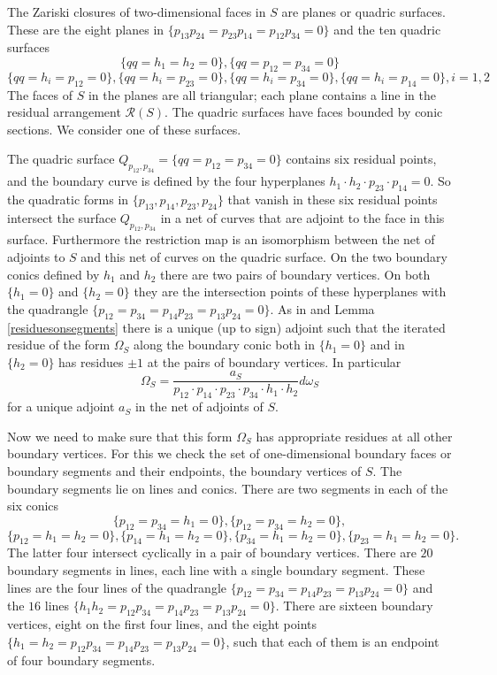 \documentclass[12pt]{extarticle}
\theoremstyle{definition}
\newenvironment{example}
{\pushQED{\qed}\renewcommand{\qedsymbol}{$\diamond$}\examplex}
{\popQED\endexamplex}
\begin{document}
\begin{example}
The Zariski closures of two-dimensional faces in $S$ are planes or quadric surfaces.  These are the eight planes in $\{p_{13}p_{24} = p_{23}p_{14} = p_{12}p_{34}=0\}$ and the ten quadric surfaces 
$$\{qq=h_1=h_2=0\},\{qq=p_{12}=p_{34}=0\}$$ 
$$\{qq=h_i=p_{12}=0\},\{qq=h_i=p_{23}=0\},\{qq=h_i=p_{34}=0\},\{qq=h_i=p_{14}=0\}, i=1,2 $$
The faces of $S$ in the planes are all triangular;  each plane contains a line in the residual arrangement $\mathcal{R}(S)$.  
The quadric surfaces have faces bounded by conic sections. We consider one of these surfaces. 

The quadric surface $Q_{p_{12},p_{34}}=\{qq=p_{12}=p_{34}=0\}$ contains six residual points, and the boundary curve is defined by the four hyperplanes $h_1\cdot h_2\cdot p_{23}\cdot p_{14}=0$. So the quadratic forms in $\{p_{13},p_{14},p_{23},p_{24}\}$ that vanish in these six residual points intersect the surface $Q_{p_{12},p_{34}}$ in a net of curves that are adjoint to the face in this surface. Furthermore the restriction map is an isomorphism between the net of adjoints to $S$ and this net of curves on the quadric surface.  On the two boundary conics defined by $h_1$ and $h_2$ there are two pairs of boundary vertices.
On both $\{h_1=0\}$ and $\{h_2=0\}$ they are the intersection points of these hyperplanes with the quadrangle $\{p_{12}=p_{34}=p_{14}p_{23}=p_{13}p_{24}=0\}$.
As in \cite[Example 2.13]{kohn2021adjoints} and Lemma \ref{residuesonsegments} there is a unique (up to sign) adjoint such that the iterated residue of the form $\Omega_S$ along the boundary conic both in $\{h_1=0\}$ and in $\{h_2=0\}$ has residues $\pm 1$ at the pairs of boundary vertices.  In particular  
$$\Omega_S=\frac{a_S}{p_{12}\cdot p_{14}\cdot p_{23}\cdot p_{34}\cdot h_1\cdot h_2}d\omega_S$$ for a unique adjoint $a_S$ in the net of adjoints of $S$.

Now we need to make sure that this form $\Omega_S$ has appropriate residues at all other boundary vertices.
For this we check the set of one-dimensional boundary faces or boundary segments and their endpoints, the boundary vertices of $S$.  
The boundary segments lie on lines and conics. There are two segments in each of the six conics
$$\{p_{12}=p_{34}=h_1=0\},\{p_{12}=p_{34}=h_2=0\}, $$
$$\{p_{12}=h_1=h_2=0\},\{p_{14}=h_1=h_2=0\},
\{p_{34}=h_1=h_2=0\},\{p_{23}=h_1=h_2=0\}. $$
The latter four intersect cyclically in a pair of boundary vertices. 
 There are $20$ boundary segments in lines, each line with a single boundary segment.
 These lines are the four lines of the quadrangle $\{p_{12}=p_{34}=p_{14}p_{23}=p_{13}p_{24}=0\}$ and the $16$ lines $\{h_1h_2=p_{12}p_{34}=p_{14}p_{23}=p_{13}p_{24}=0\}$.
 There are sixteen boundary vertices, eight on the first four lines, and the eight points $\{h_1=h_2=p_{12}p_{34}=p_{14}p_{23}=p_{13}p_{24}=0\}$, such that each of them is an endpoint of four boundary segments.


\end{example}
\end{document}
